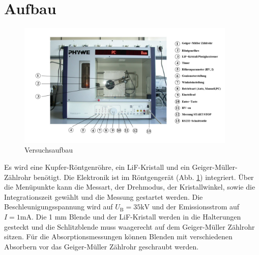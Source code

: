 \section{Aufbau}
\label{sec:aufbau}
\begin{figure}
    \centering
    \includegraphics[height=6.0cm]{data/abb4.jpg}
    \caption{Versuchsaufbau \cite{V602}}
    \label{fig:abb4}
\end{figure}
\noindent
Es wird eine Kupfer-Röntgenröhre, ein LiF-Kristall und ein Geiger-Müller-Zählrohr benötigt.
Die Elektronik ist im Röntgengerät (Abb. \ref{fig:abb4}) integriert.
Über die Menüpunkte kann die Messart, der Drehmodus, der Kristallwinkel, sowie die Integrationszeit gewählt und die Messung gestartet werden.
Die Beschleunigungsspannung wird auf $U_\text{B} = 35 \text{kV}$ und der Emissionsstrom auf $I = 1 \text{mA}$.
Die 1 mm Blende und der LiF-Kristall werden in die Halterungen gesteckt und die Schlitzblende muss waagerecht auf dem Geiger-Müller Zählrohr sitzen.
Für die Absorptionsmessungen können Blenden mit verschiedenen Absorbern vor das Geiger-Müller Zählrohr geschraubt werden.

